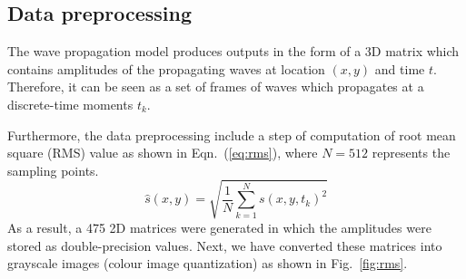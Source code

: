 \subsection{Data preprocessing}
The wave propagation model produces outputs in the form of a 3D matrix which contains amplitudes of the propagating waves at location \((x, y)\) and time \(t\). 
Therefore, it can be seen as a set of frames of waves which propagates at a discrete-time moments \(t_k\).

Furthermore, the data preprocessing include a step of computation of root mean square (RMS) value as shown in Eqn.~(\ref{eq:rms}), where \(N=512\) represents the sampling points.
\begin{equation}
	\hat{s}(x,y) = \sqrt{\frac{1}{N}\sum_{k=1}^{N} s(x,y,t_k)^2}
	\label{eq:rms}
\end{equation}
As a result, a 475 2D matrices were generated in which the amplitudes were stored as double-precision values.
Next, we have converted these matrices into grayscale images (colour image quantization) as shown in Fig.~\ref{fig:rms}.

